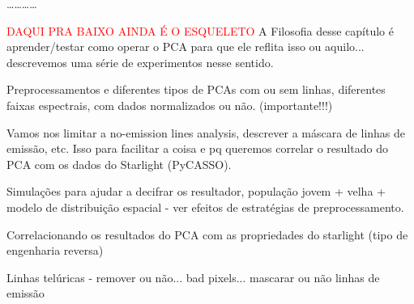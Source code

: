 %

\ldots \dots \ldots \ldots
                                                                                                                                                                                                                                                                               
\textcolor{red}{DAQUI PRA BAIXO AINDA É O ESQUELETO}
\ojo A Filosofia desse capítulo é aprender/testar como operar o PCA para que ele
reflita isso ou aquilo... descrevemos uma série de experimentos nesse sentido.

Preprocessamentos e diferentes tipos de PCAs com ou sem linhas, diferentes
faixas espectrais, com dados normalizados ou não. (importante!!!)

Vamos nos limitar a no-emission lines analysis, descrever a máscara de linhas de
emissão, etc. Isso para facilitar a coisa e pq queremos correlar o resultado do
PCA com os dados do Starlight (PyCASSO).

Simulações para ajudar a decifrar os resultador, população jovem + velha +
modelo de distribuição espacial - ver efeitos de estratégias de
preprocessamento.

Correlacionando os resultados do PCA com as propriedades do starlight (tipo de
engenharia reversa)

Linhas telúricas - remover ou não... bad pixels... mascarar ou não linhas de
emissão